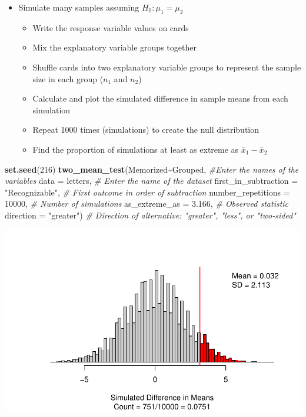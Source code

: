 \documentclass[
]{report}
\newenvironment{Shaded}{\begin{snugshade}}{\end{snugshade}}
\newcommand{\AttributeTok}[1]{\textcolor[rgb]{0.13,0.29,0.53}{#1}}
\newcommand{\CommentTok}[1]{\textcolor[rgb]{0.56,0.35,0.01}{\textit{#1}}}
\newcommand{\DecValTok}[1]{\textcolor[rgb]{0.00,0.00,0.81}{#1}}
\newcommand{\FloatTok}[1]{\textcolor[rgb]{0.00,0.00,0.81}{#1}}
\newcommand{\FunctionTok}[1]{\textcolor[rgb]{0.13,0.29,0.53}{\textbf{#1}}}
\newcommand{\NormalTok}[1]{#1}
\newcommand{\SpecialCharTok}[1]{\textcolor[rgb]{0.81,0.36,0.00}{\textbf{#1}}}
\newcommand{\StringTok}[1]{\textcolor[rgb]{0.31,0.60,0.02}{#1}}
\begin{document}
\begin{itemize}
\item
  Simulate many samples assuming \(H_0: \mu_1 = \mu_2\)

  \begin{itemize}
  \item
    Write the response variable values on cards
  \item
    Mix the explanatory variable groups together
  \item
    Shuffle cards into two explanatory variable groups to represent the sample size in each group (\(n_1\) and \(n_2\))
  \item
    Calculate and plot the simulated difference in sample means from each simulation
  \item
    Repeat 1000 times (simulations) to create the null distribution
  \item
    Find the proportion of simulations at least as extreme as \(\bar{x}_1 - \bar{x}_2\)
  \end{itemize}
\end{itemize}

\vspace{1mm}

\begin{Shaded}
\begin{Highlighting}[]
\FunctionTok{set.seed}\NormalTok{(}\DecValTok{216}\NormalTok{)}
\FunctionTok{two\_mean\_test}\NormalTok{(Memorized}\SpecialCharTok{\textasciitilde{}}\NormalTok{Grouped, }\CommentTok{\#Enter the names of the variables}
              \AttributeTok{data =}\NormalTok{ letters,  }\CommentTok{\# Enter the name of the dataset}
              \AttributeTok{first\_in\_subtraction =} \StringTok{"Recognizable"}\NormalTok{, }\CommentTok{\# First outcome in order of subtraction}
              \AttributeTok{number\_repetitions =} \DecValTok{10000}\NormalTok{,  }\CommentTok{\# Number of simulations}
              \AttributeTok{as\_extreme\_as =} \FloatTok{3.166}\NormalTok{,  }\CommentTok{\# Observed statistic}
              \AttributeTok{direction =} \StringTok{"greater"}\NormalTok{)  }\CommentTok{\# Direction of alternative: "greater", "less", or "two{-}sided"}
\end{Highlighting}
\end{Shaded}

\begin{center}\includegraphics[width=0.7\linewidth]{12-VN12-1ofeach_files/figure-latex/unnamed-chunk-3-1} \end{center}
\end{document}
